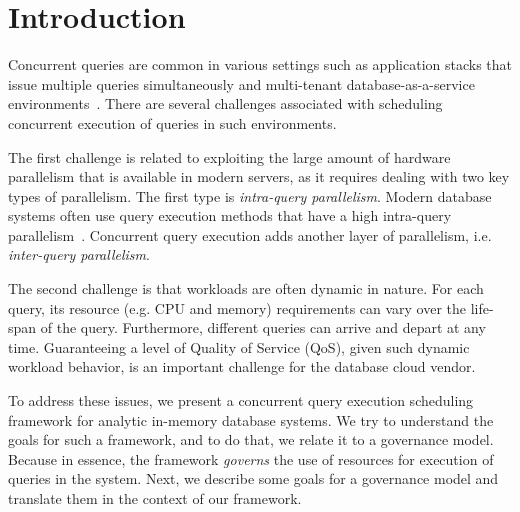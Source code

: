\section{Introduction}\label{sec:intro}
Concurrent queries are common in various settings such as application stacks that issue multiple queries simultaneously and multi-tenant database-as-a-service environments~\cite{NarasayyaMSLSC15, NarasayyaDSCC13}.
There are several challenges associated with scheduling  concurrent execution of queries in such environments.

The first challenge is related to exploiting the large amount of hardware parallelism that is available in modern servers, as it requires dealing with two key types of parallelism.
The first type is \textit{intra-query parallelism}. 
Modern database systems often use query execution methods that have a high intra-query parallelism~\cite{qsstorage,morsel,wang2016elastic}.
Concurrent query execution adds another layer of parallelism, i.e. \textit{inter-query parallelism}. 

The second challenge is that workloads are often dynamic in nature. 
For each query, its resource (e.g. CPU and memory) requirements can vary over the life-span of the query. 
Furthermore, different queries can arrive and depart at any time. %
Guaranteeing a  level of Quality of Service (QoS), given such dynamic workload behavior, is an important challenge for the database cloud vendor. 


To address these issues, we present a concurrent query execution scheduling framework for analytic in-memory database systems. 
We try to understand the goals for such a framework, and to do that, we relate it to a governance model.
Because in essence, the framework \textit{governs} the use of resources for execution of queries in the system. 
Next, we describe some goals for a governance model and translate them in the context of our framework.  

